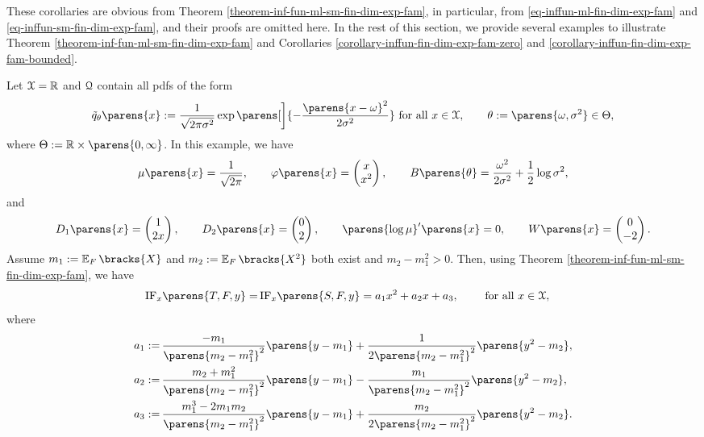 These corollaries are obvious from Theorem \ref{theorem-inf-fun-ml-sm-fin-dim-exp-fam}, in particular, from \eqref{eq-inffun-ml-fin-dim-exp-fam} and \eqref{eq-inffun-sm-fin-dim-exp-fam}, and their proofs are omitted here. In the rest of this section, we provide several examples to illustrate Theorem \ref{theorem-inf-fun-ml-sm-fin-dim-exp-fam} and Corollaries \ref{corollary-inffun-fin-dim-exp-fam-zero} and \ref{corollary-inffun-fin-dim-exp-fam-bounded}. 

\begin{example}[name=Normal location-scale model]
	Let $\mathcal{X} = \mathbb{R}$ and $\mathcal{Q}$ contain all pdfs of the form 
	\begin{align*}
		\tilde{q}_{\theta} \parens{x} := \frac{1}{\sqrt{2 \pi \sigma^2}} \exp \parens[\bigg]{- \frac{\parens{x - \omega}^2}{2 \sigma^2}} \text{ for all } x \in \mathcal{X}, \qquad \theta := \parens{\omega, \sigma^2} \in \Theta, 
	\end{align*}
	where $\Theta := \mathbb{R} \times \parens{0, \infty}$. In this example, we have 
	\begin{align*}
		\mu \parens{x} = \frac{1}{\sqrt{2 \pi}}, \qquad \varphi \parens{x} = \begin{pmatrix}
			x \\ x^2
		\end{pmatrix}, \qquad B \parens{\theta} = \frac{\omega^2}{2 \sigma^2} + \frac{1}{2} \log \sigma^2, 
	\end{align*}
	and 
	\begin{align*}
		D_1 \parens{x} = \begin{pmatrix}
			1 \\ 2x
		\end{pmatrix}, \qquad D_2 \parens{x} = \begin{pmatrix}
			0 \\ 2
		\end{pmatrix}, \qquad \parens{\log \mu}' \parens{x} = 0, \qquad  W \parens{x} = \begin{pmatrix}
			0 \\ -2
		\end{pmatrix}. 
	\end{align*}
	Assume $m_1 := \E_F \bracks{X}$ and $m_2 := \E_F \bracks{X^2}$ both exist and $m_2 - m_1^2 > 0$. Then, using Theorem \ref{theorem-inf-fun-ml-sm-fin-dim-exp-fam}, we have 
	\begin{align*}
		\mathrm{IF}_x \parens{T, F, y} = & \, \mathrm{IF}_x \parens{S, F, y} = a_1 x^2 + a_2 x + a_3, \qquad \text{ for all } x \in \calX, 
	\end{align*}
	where 
	\begin{align*}
		a_1 := & \, \frac{-m_1}{\parens{m_2 - m_1^2}^2} \parens{y - m_1} + \frac{1}{2 \parens{m_2 - m_1^2}^2} \parens{y^2 - m_2}, \\
		a_2 := & \, \frac{m_2 + m_1^2}{\parens{m_2 - m_1^2}^2} \parens{y - m_1} - \frac{m_1}{\parens{m_2 - m_1^2}^2} \parens{y^2 - m_2}, \\ 
		a_3 := & \, \frac{m_1^3 - 2 m_1 m_2}{\parens{m_2 - m_1^2}^2} \parens{y - m_1} + \frac{m_2}{2 \parens{m_2 - m_1^2}^2} \parens{y^2 - m_2}. 
	\end{align*}
	

\end{example}
